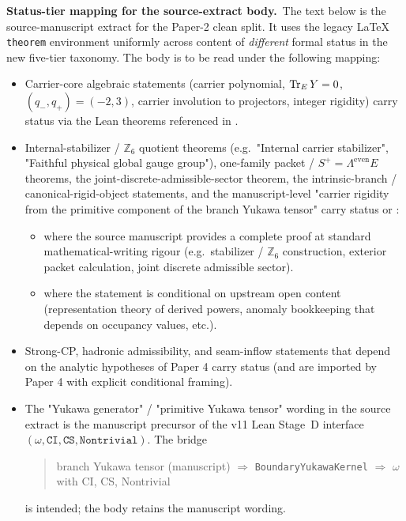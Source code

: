 \documentclass[11pt,a4paper]{article}
\begin{document}
\begin{tfptwarningbox}
\textbf{Status-tier mapping for the source-extract body.}\
The text below is the source-manuscript extract for the Paper-2
clean split. It uses the legacy \LaTeX{} \texttt{theorem}
environment uniformly across content of \emph{different} formal
status in the new five-tier taxonomy. The body is to be read
under the following mapping:

\smallskip
\begin{itemize}[leftmargin=1.7em, itemsep=0pt]
    \item Carrier-core algebraic statements
        (carrier polynomial, $\operatorname{Tr}_E Y = 0$, $(q_-,q_+)=(-2,3)$,
        carrier involution to projectors, integer rigidity)
        carry status  via the Lean theorems referenced
        in .
    \item Internal-stabilizer / $\mathbb Z_6$ quotient theorems
        (e.g.\ "Internal carrier stabilizer",
        "Faithful physical global gauge group"),
        one-family packet / $S^+ = \Lambda^{\mathrm{even}} E$
        theorems, the joint-discrete-admissible-sector theorem,
        the intrinsic-branch / canonical-rigid-object
        statements, and the manuscript-level "carrier rigidity
        from the primitive component of the branch Yukawa
        tensor" carry status  or :
        \begin{itemize}[leftmargin=1.2em, itemsep=0pt]
            \item \stag{M} where the source manuscript provides
                a complete proof at standard mathematical-writing
                rigour (e.g.\ stabilizer / $\mathbb Z_6$
                construction, exterior packet calculation, joint
                discrete admissible sector).
            \item {} where the statement is conditional on
                upstream open content (representation theory of
                derived powers, anomaly bookkeeping that depends
                on \stag{C} occupancy values, etc.).
        \end{itemize}
    \item Strong-CP, hadronic admissibility, and seam-inflow
        statements that depend on the analytic hypotheses of
        Paper 4 carry status  (and are imported by
        Paper 4 with explicit conditional framing).
    \item The "Yukawa generator" / "primitive Yukawa tensor"
        wording in the source extract is the manuscript
        precursor of the v11 Lean Stage~D interface
        $(\omega, \texttt{CI}, \texttt{CS}, \texttt{Nontrivial})$.
        The bridge
        \begin{quote}\small
        branch Yukawa tensor (manuscript)
        \;$\Rightarrow$\;
        \texttt{BoundaryYukawaKernel}
        \;$\Rightarrow$\;
        $\omega$ with CI, CS, Nontrivial 
        \end{quote}
        is intended; the body retains the manuscript wording.
\end{itemize}


\end{tfptwarningbox}
\end{document}
